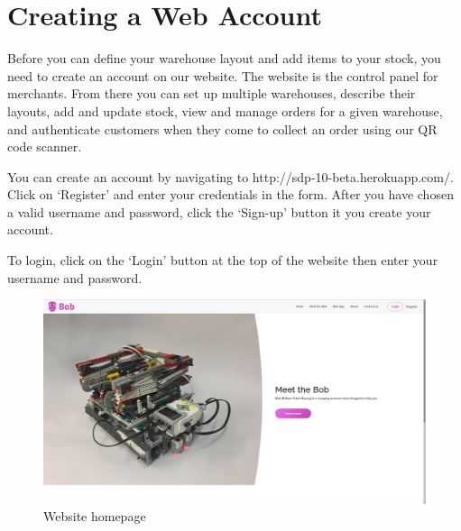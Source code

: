 \documentclass[onecolumn]{IEEEtran}
\begin{document}
\section{Creating a Web Account}
Before you can define your warehouse layout and add items to your stock, you need to create an account on our website. The website is the control panel for merchants. From there you can set up multiple warehouses, describe their layouts, add and update stock, view and manage orders for a given warehouse, and authenticate customers when they come to collect an order using our QR code scanner.
\par You can create an account by navigating to http://sdp-10-beta.herokuapp.com/. Click on ‘Register’ and enter your credentials in the form. After you have chosen a valid username and password, click the ‘Sign-up’ button it you create your account.
\par To login, click on the ‘Login’ button at the top of the website then enter your username and password.
\begin{figure}[H]
    \begin{center}
    \includegraphics[width=1\textwidth]{website_homepage.png}
    \caption{Website homepage}
    \label{fig: figure}
    \end{center}
\end{figure}
\end{document}

